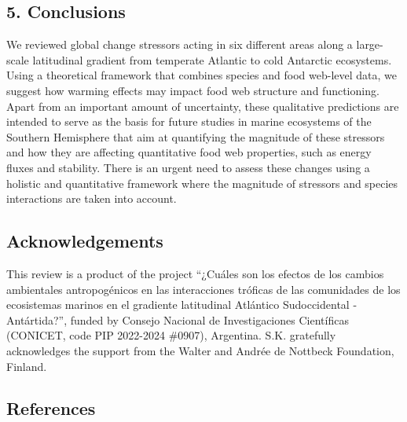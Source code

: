 \documentclass[
]{article}
\begin{document}
\subsection{5. Conclusions}\label{conclusions}

We reviewed global change stressors acting in six different areas along
a large-scale latitudinal gradient from temperate Atlantic to cold
Antarctic ecosystems. Using a theoretical framework that combines
species and food web-level data, we suggest how warming effects may
impact food web structure and functioning. Apart from an important
amount of uncertainty, these qualitative predictions are intended to
serve as the basis for future studies in marine ecosystems of the
Southern Hemisphere that aim at quantifying the magnitude of these
stressors and how they are affecting quantitative food web properties,
such as energy fluxes and stability. There is an urgent need to assess
these changes using a holistic and quantitative framework where the
magnitude of stressors and species interactions are taken into account.

\subsection{Acknowledgements}\label{acknowledgements}

This review is a product of the project ``¿Cuáles son los efectos de los
cambios ambientales antropogénicos en las interacciones tróficas de las
comunidades de los ecosistemas marinos en el gradiente latitudinal
Atlántico Sudoccidental - Antártida?'', funded by Consejo Nacional de
Investigaciones Científicas (CONICET, code PIP 2022-2024 \#0907),
Argentina. S.K. gratefully acknowledges the support from the Walter and
Andrée de Nottbeck Foundation, Finland.

\subsection*{References}\label{references}
\end{document}
